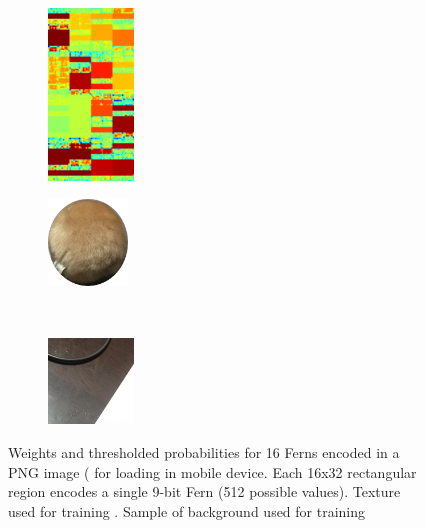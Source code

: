 \begin{figure}[ht]
    \centering
\begin{minipage}[b]{.3\textwidth}
	 \begin{subfigure}[b]{.4\linewidth}
	   \includegraphics[height=1.8in]{images/fernUnpacked1.png}
\caption{}
\label{ts:scr1}
	  \end{subfigure}
	
	 \end{minipage}
	 \begin{minipage}[b]{.3\textwidth}
 \begin{subfigure}[b]{.4\linewidth}
	   \includegraphics[height=0.9in]{images/t2.jpg}
\caption{}
\label{ts:scr3}
	 \end{subfigure}\\
\begin{subfigure}[b]{.4\linewidth}
	   \includegraphics[height=0.9in]{images/backgrounds.jpg}
\caption{}
\label{ts:scr4}
	\end{subfigure}
	 \end{minipage}

    \caption{Weights and thresholded probabilities for 16 Ferns encoded  in a PNG image  (\protect {}  for loading in mobile device. Each 16x32 rectangular region encodes a single 9-bit Fern (512 possible values).  \protect {} Texture used for training \protect {}. \protect {} Sample of background used for training \protect {}}
    \label{TSamples1}
\end{figure}

